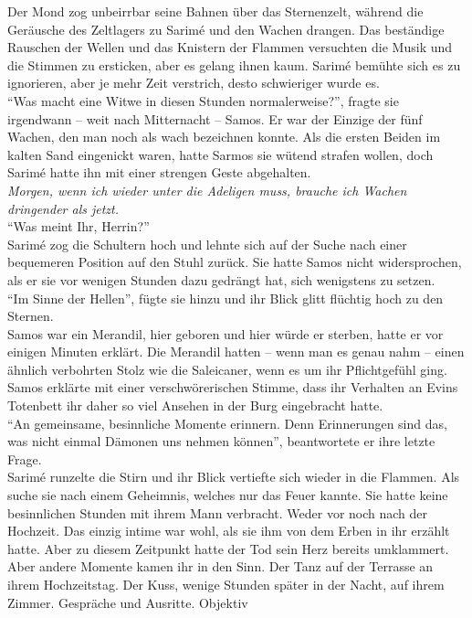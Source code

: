 Der Mond zog unbeirrbar seine Bahnen über das Sternenzelt, während die Geräusche des Zeltlagers zu 
Sarimé und den Wachen drangen. Das beständige Rauschen der Wellen und das Knistern der Flammen 
versuchten die Musik und die Stimmen zu ersticken, aber es gelang ihnen kaum. Sarimé bemühte sich 
es zu ignorieren, aber je mehr Zeit verstrich, desto schwieriger wurde es. \\
``Was macht eine Witwe in diesen Stunden normalerweise?'', fragte sie irgendwann – weit nach 
Mitternacht – Samos. Er war der Einzige der fünf Wachen, den man noch als wach bezeichnen konnte. 
Als die ersten Beiden im kalten Sand eingenickt waren, hatte Sarmos sie wütend strafen wollen, doch 
Sarimé hatte ihn mit einer strengen Geste abgehalten.\\
\textit{Morgen, wenn ich wieder unter die Adeligen muss, brauche ich Wachen dringender als jetzt.}\\
``Was meint Ihr, Herrin?''\\
Sarimé zog die Schultern hoch und lehnte sich auf der Suche nach einer bequemeren Position auf den 
Stuhl zurück. Sie hatte Samos nicht widersprochen, als er sie vor wenigen Stunden dazu gedrängt 
hat, sich wenigstens zu setzen. \\
``Im Sinne der Hellen'', fügte sie hinzu und ihr Blick glitt flüchtig hoch zu den Sternen.\\
Samos war ein Merandil, hier geboren und hier würde er sterben, hatte er vor einigen Minuten 
erklärt. Die Merandil hatten – wenn man es genau nahm – einen ähnlich verbohrten Stolz wie die 
Saleicaner, wenn es um ihr Pflichtgefühl ging. Samos erklärte mit einer verschwörerischen Stimme, 
dass ihr Verhalten an Evins Totenbett ihr daher so viel Ansehen in der Burg eingebracht hatte. \\
``An gemeinsame, besinnliche Momente erinnern. Denn Erinnerungen sind das, was nicht einmal Dämonen 
uns nehmen können'', beantwortete er ihre letzte Frage.\\
Sarimé runzelte die Stirn und ihr Blick vertiefte sich wieder in die Flammen. Als suche sie nach 
einem Geheimnis, welches nur das Feuer kannte. Sie hatte keine besinnlichen Stunden mit ihrem 
Mann verbracht. Weder vor noch nach der Hochzeit. Das einzig intime war wohl, als sie ihm von dem 
Erben in ihr erzählt hatte. Aber zu diesem Zeitpunkt hatte der Tod sein Herz bereits umklammert.
Aber andere Momente kamen ihr in den Sinn. Der Tanz auf der Terrasse an ihrem Hochzeitstag. Der 
Kuss, wenige Stunden später in der Nacht, auf ihrem Zimmer. Gespräche und Ausritte. Objektiv 
